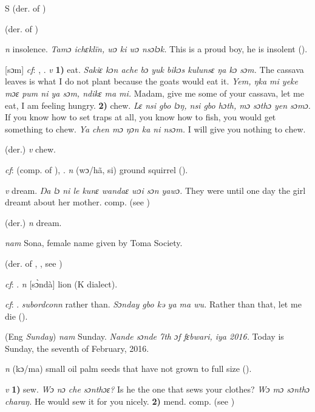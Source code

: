 \begin{letter}{S}
 (der. of ) 

 (der. of ) 

 \textit{n} insolence. \textit{Tamɔ ichɛklïn, wɔ ki wɔ nsɔlɔk.} This is a proud boy, he is insolent (\citealt{Pichl1967}). 

 [sɔm] \textit{cf}: , . \textit{v} \textbf{1)} eat. \textit{Sakiɛ kɔn ache bɔ yuk bikɔs kulunsɛ ŋa kɔ sɔm.} The cassava leaves is what I do not plant because the goats would eat it. \textit{Yem, ŋka mi yeke mɔɛ pum ni ya sɔm, ndikɛ ma mi.} Madam, give me some of your cassava, let me eat, I am feeling hungry. \textbf{2)} chew. \textit{Lɛ nsi gbo lɔŋ, nsi gbo hɔth, mɔ sɔthɔ yen sɔmɔ.} If you know how to set traps at all, you know how to fish, you would get something to chew. \textit{Ya chen mɔ ŋɔn ka ni nsɔm.} I will give you nothing to chew.

 (der.) \textit{v} chew.

 \textit{cf}:  (comp. of ), . \textit{n} (wɔ/hã, si) ground squirrel (\citealt{Pichl1967}).

 \textit{v} dream. \textit{Ŋa lɔ ni le kunɛ wandaɛ wɔi sɔn yawɔ.} They were until one day the girl dreamt about her mother. comp.  (see )

 (der.) \textit{n} dream.

 \textit{nam} Sona, female name given by Toma Society. 

 (der. of , , see ) 

 \textit{cf}: . \textit{n} [sɔ̀ndà] lion (K dialect). 

 \textit{cf}: . \textit{subordconn} rather than. \textit{Sɔnday gbo kə ya ma wu.} Rather than that, let me die (\citealt{Pichl1967}).

 (Eng \textit{Sunday}) \textit{nam} Sunday. \textit{Nande sɔnde 7th ɔf fɛbwari, iya 2016.} Today is Sunday, the seventh of February, 2016.

 \textit{n} (kɔ/ma) small oil palm seeds that have not grown to full size (\citealt{Pichl1967}). 

 \textit{v} \textbf{1)} sew. \textit{Wɔ nɔ che sɔnthɔɛ?} Is he the one that sews your clothes? \textit{Wɔ mɔ sɔnthɔ charaŋ.} He would sew it for you nicely. \textbf{2)} mend. comp.  (see ) 


\end{letter}
